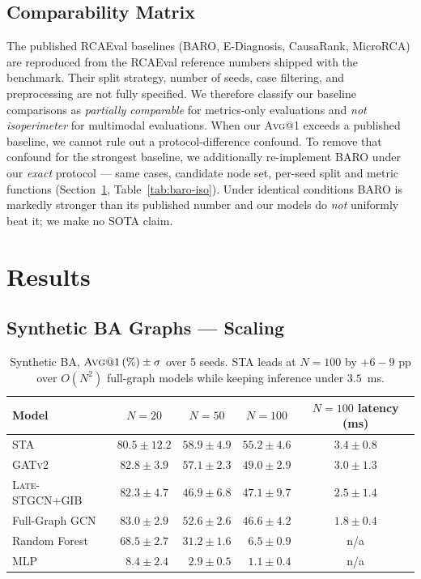 \documentclass[11pt,a4paper]{article}
\makeatletter
\newcommand{\Avg}[1]{\textsc{Avg}@{#1}}
\newcommand{\STA}{\textsc{STA}}
\newcommand{\GATv}{\textsc{GATv2}}
\newcommand{\Late}{\textsc{Late-STGCN+GIB}}
\makeatother
\begin{document}
\subsection{Comparability Matrix}
\label{sec:comparability}

The published RCAEval baselines (BARO, E-Diagnosis, CausaRank, MicroRCA) are
reproduced from the RCAEval reference numbers shipped with the benchmark.
Their split strategy, number of seeds, case filtering, and preprocessing are
not fully specified. We therefore classify our baseline comparisons as
\emph{partially comparable} for metrics-only evaluations and \emph{not
isoperimeter} for multimodal evaluations. When our \Avg{1} exceeds a published
baseline, we cannot rule out a protocol-difference confound. To remove that
confound for the strongest baseline, we additionally re-implement BARO under
our \emph{exact} protocol --- same cases, candidate node set, per-seed split and
metric functions (Section~\ref{sec:results}, Table~\ref{tab:baro-iso}). Under
identical conditions BARO is markedly stronger than its published number and our
models do \emph{not} uniformly beat it; we make no SOTA claim.

\section{Results}
\label{sec:results}

\subsection{Synthetic BA Graphs --- Scaling}

\begin{table}[t]
\centering\small
\begin{tabular}{lcccc}
\toprule
\textbf{Model} & $N{=}20$ & $N{=}50$ & $N{=}100$ & $N{=}100$ latency (ms) \\
\midrule
\STA{}            & $80.5 \pm 12.2$ & $58.9 \pm 4.9$  & $\mathbf{55.2 \pm 4.6}$ & $3.4 \pm 0.8$ \\
\GATv{}           & $82.8 \pm 3.9$  & $\mathbf{57.1 \pm 2.3}$ & $49.0 \pm 2.9$ & $3.0 \pm 1.3$ \\
\Late{}           & $82.3 \pm 4.7$  & $46.9 \pm 6.8$  & $47.1 \pm 9.7$ & $2.5 \pm 1.4$ \\
Full-Graph GCN    & $\mathbf{83.0 \pm 2.9}$ & $52.6 \pm 2.6$ & $46.6 \pm 4.2$ & $1.8 \pm 0.4$ \\
Random Forest     & $68.5 \pm 2.7$  & $31.2 \pm 1.6$  & $\phantom{0}6.5 \pm 0.9$ & n/a \\
MLP               & $\phantom{0}8.4 \pm 2.4$ & $\phantom{0}2.9 \pm 0.5$ & $\phantom{0}1.1 \pm 0.4$ & n/a \\
\bottomrule
\end{tabular}
\caption{Synthetic BA, $\Avg{1}\,(\%)\pm\sigma$ over 5 seeds. \STA{} leads at
$N{=}100$ by $+6{-}9$ pp over $O(N^2)$ full-graph models while keeping
inference under $3.5$~ms.}
\label{tab:sim}
\end{table}
\end{document}
